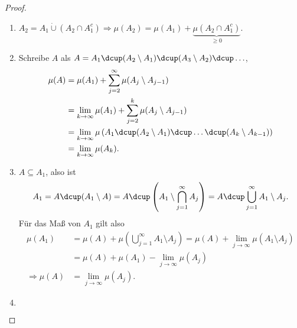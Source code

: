 \begin{proof}
\begin{enumerate}[label=(\roman{*})]
  \item $A_2 = A_1\dot{\cup} (A_2 \cap A_1^c) \Rightarrow \mu(A_2) = \mu(A_1) +
  \underbrace{\mu(A_2\cap A_1^c)}_{\ge 0}$.
  \item Schreibe $A$ als $A = A_1\dcup (A_2\setminus A_1) \dcup (A_3\setminus
  A_2) \dcup \ldots$,
\begin{align*}
\mu(A) &= \mu(A_1) + \sum\limits_{j=2}^\infty \mu(A_j \setminus A_{j-1})\\
&= \lim\limits_{k\to\infty} \mu(A_1) + \sum\limits_{j=2}^k \mu(A_j
\setminus A_{j-1})\\
&= \lim\limits_{k\to\infty} \mu\left(
A_1\dcup (A_2\setminus A_1) \dcup \ldots \dcup (A_k\setminus A_{k-1})
 \right)\\
&= \lim\limits_{k\to\infty} \mu(A_k).
\end{align*}
  \item $A\subseteq A_1$, also ist
  \begin{align*}
  A_1 = A\dcup (A_1\setminus A) = A\dcup \left(A_1 \setminus
  \bigcap_{j=1}^\infty A_j\right) = A\dcup \bigcup_{j=1}^\infty A_1\setminus
  A_j.
  \end{align*}
 Für das Maß von $A_1$ gilt also
 \begin{align*}
 \mu(A_1) &= \mu(A) + \mu\left(\bigcup_{j=1}^\infty A_1\setminus
  A_j\right) = \mu(A) + \lim\limits_{j\to\infty} \mu(A_1\setminus A_j)
  \\ &= \mu(A) + \mu(A_1) - \lim\limits_{j\to\infty}  \mu(A_j)\\
  \Rightarrow \mu(A) &= \lim\limits_{j\to\infty}  \mu(A_j).
 \end{align*}
\item 
\begin{align*}

\end{align*}
\end{enumerate}
\end{proof}
